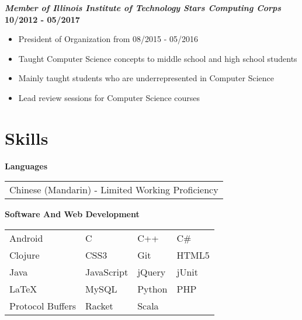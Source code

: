 \documentclass[10pt]{res}
\begin{document}
\begin{resume}
	\textbf{\textit{Member of Illinois Institute of Technology Stars Computing
	Corps}}
	\hfill {\bf 10/2012 - 05/2017}
	\begin{itemize}
  \setlength\itemsep{0em}
	  \item President of Organization from 08/2015 - 05/2016
	  \item Taught Computer Science concepts to middle school and high school students  
	  \item Mainly taught students who are underrepresented in Computer Science 
	  \item Lead review sessions for Computer Science courses 
	\end{itemize}
	
\section{Skills}
\textbf{Languages} \\ 
	\begin{tabular}{ l }
		Chinese (Mandarin) - Limited Working Proficiency
	\end{tabular}
	
	\vspace{1pt}
\textbf{Software And Web Development} \\
	\begin{tabular}{  l    l    l    l  }
		Android	           &   C 	     			&    C++ 			&   C\# 	\\ 
		Clojure 			& 	CSS3 	 		& 	Git	 			& 	HTML5  \\
	     Java  				& 	JavaScript 		&	jQuery            &   jUnit  	 \\
		LaTeX   			&   MySQL 			&	Python       	&	PHP  	 \\	   
  	 	Protocol Buffers   	& 	Racket         	&	Scala			&				
	\end{tabular}
\end{resume}
\end{document}
